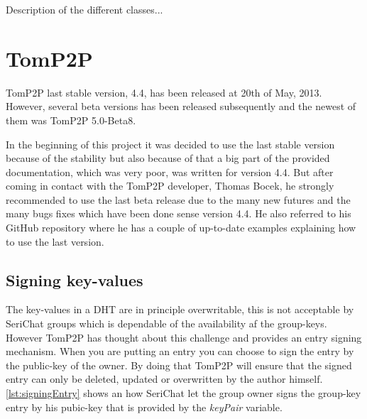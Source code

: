 \begin{figure}[bth]
\end{figure}

Description of the different classes...

\section{TomP2P}
TomP2P last stable version, 4.4, has been released at 20th of May, 2013. However, several beta versions has been released subsequently and the newest of them was TomP2P 5.0-Beta8.

In the beginning of this project it was decided to use the last stable version because of the stability but also because of that a big part of the provided documentation, which was very poor, was written for version 4.4. But after coming in contact with the TomP2P developer, Thomas Bocek, he strongly recommended to use the last beta release due to the many new futures and the many bugs fixes which have been done sense version 4.4. He also referred to his GitHub repository where he has a couple of up-to-date examples explaining how to use the last version.

\subsection{Signing key-values}
The key-values in a DHT are in principle overwritable, this is not acceptable by SeriChat groups which is dependable of the availability af the group-keys. However TomP2P has thought about this challenge and provides an entry signing mechanism. When you are putting an entry you can choose to sign the entry by the public-key of the owner. By doing that TomP2P will ensure that the signed entry can only be deleted, updated or overwritten by the author himself. \autoref{lst:signingEntry} shows an how SeriChat let the group owner signs the group-key entry by his pubic-key that is provided by the \textit{keyPair } variable.

